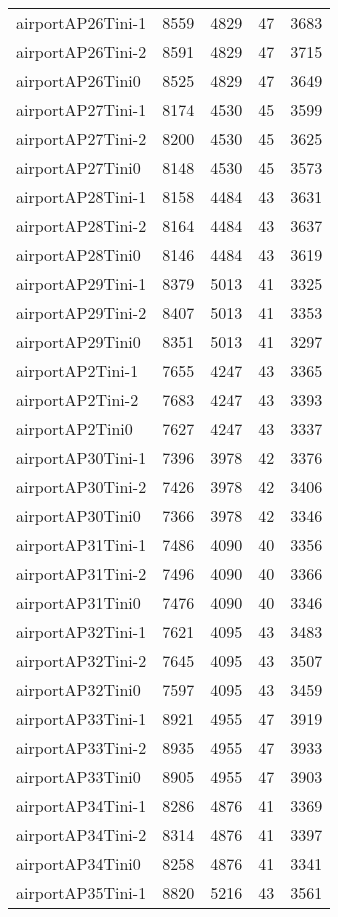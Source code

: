 \begin{longtable}{lrrrr}
airportAP26Tini-1 & 8559 & 4829 & 47 & 3683 \\
airportAP26Tini-2 & 8591 & 4829 & 47 & 3715 \\
airportAP26Tini0 & 8525 & 4829 & 47 & 3649 \\
airportAP27Tini-1 & 8174 & 4530 & 45 & 3599 \\
airportAP27Tini-2 & 8200 & 4530 & 45 & 3625 \\
airportAP27Tini0 & 8148 & 4530 & 45 & 3573 \\
airportAP28Tini-1 & 8158 & 4484 & 43 & 3631 \\
airportAP28Tini-2 & 8164 & 4484 & 43 & 3637 \\
airportAP28Tini0 & 8146 & 4484 & 43 & 3619 \\
airportAP29Tini-1 & 8379 & 5013 & 41 & 3325 \\
airportAP29Tini-2 & 8407 & 5013 & 41 & 3353 \\
airportAP29Tini0 & 8351 & 5013 & 41 & 3297 \\
airportAP2Tini-1 & 7655 & 4247 & 43 & 3365 \\
airportAP2Tini-2 & 7683 & 4247 & 43 & 3393 \\
airportAP2Tini0 & 7627 & 4247 & 43 & 3337 \\
airportAP30Tini-1 & 7396 & 3978 & 42 & 3376 \\
airportAP30Tini-2 & 7426 & 3978 & 42 & 3406 \\
airportAP30Tini0 & 7366 & 3978 & 42 & 3346 \\
airportAP31Tini-1 & 7486 & 4090 & 40 & 3356 \\
airportAP31Tini-2 & 7496 & 4090 & 40 & 3366 \\
airportAP31Tini0 & 7476 & 4090 & 40 & 3346 \\
airportAP32Tini-1 & 7621 & 4095 & 43 & 3483 \\
airportAP32Tini-2 & 7645 & 4095 & 43 & 3507 \\
airportAP32Tini0 & 7597 & 4095 & 43 & 3459 \\
airportAP33Tini-1 & 8921 & 4955 & 47 & 3919 \\
airportAP33Tini-2 & 8935 & 4955 & 47 & 3933 \\
airportAP33Tini0 & 8905 & 4955 & 47 & 3903 \\
airportAP34Tini-1 & 8286 & 4876 & 41 & 3369 \\
airportAP34Tini-2 & 8314 & 4876 & 41 & 3397 \\
airportAP34Tini0 & 8258 & 4876 & 41 & 3341 \\
airportAP35Tini-1 & 8820 & 5216 & 43 & 3561 \\

\end{longtable}
